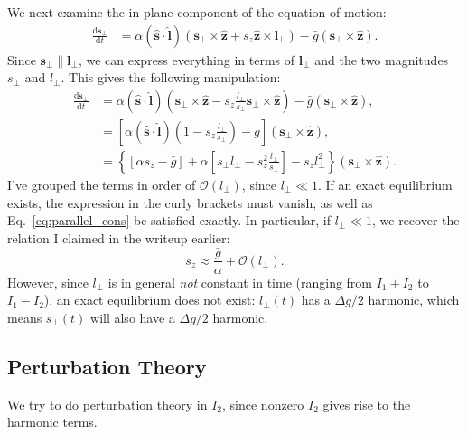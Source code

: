 \documentclass[11pt,
        usenames, %
        dvipsnames %
    ]{article}
\newcommand*{\rd}[2]{\frac{\mathrm{d}#1}{\mathrm{d}#2}}
\newcommand*{\bm}[1]{\boldsymbol{\mathbf{#1}}}
\newcommand*{\uv}[1]{\hat{\bm{#1}}}
\newcommand*{\p}[1]{\left(#1\right)}
\newcommand*{\s}[1]{\left[#1\right]}
\newcommand*{\z}[1]{\left\{#1\right\}}
\begin{document}
We next examine the in-plane component of the equation of motion:
\begin{align}
    \rd{\bm{s}_\perp}{t}
        &= \alpha\p{\uv{s} \cdot \uv{l}}
                \p{\bm{s}_\perp \times \uv{z} + s_z\uv{z} \times \bm{l}_\perp}
            - \bar{g}\p{\bm{s}_\perp \times \uv{z}}.
\end{align}
Since $\bm{s}_\perp \parallel \bm{l}_\perp$, we can express everything in terms
of $\bm{l}_\perp$ and the two magnitudes $s_\perp$ and $l_\perp$. This gives the
following manipulation:
\begin{align}
    \rd{\bm{s}_\perp}{t}
        &= \alpha\p{\uv{s} \cdot \uv{l}}
                \p{\bm{s}_\perp \times \uv{z} - s_z\frac{l_\perp}{s_\perp}
                    \bm{s}_\perp \times \uv{z}}
            - \bar{g}\p{\bm{s}_\perp \times \uv{z}},\\
        &= \s{\alpha\p{\uv{s} \cdot \uv{l}}
            \p{1 - s_z\frac{l_\perp}{s_\perp}} - \bar{g}}
            \p{\bm{s}_\perp \times \uv{z}},\\
        &= \z{\s{\alpha s_z - \bar{g}}
            + \alpha \s{s_\perp l_\perp - s_z^2\frac{l_\perp}{s_\perp}}
            - s_z l_\perp^2}
            \p{\bm{s}_\perp \times \uv{z}}\label{eq:perp_const}.
\end{align}
I've grouped the terms in order of $\mathcal{O}\p{l_\perp}$, since $l_\perp \ll
1$. If an exact equilibrium exists, the expression in the curly brackets must
vanish, as well as Eq.~\eqref{eq:parallel_cons} be satisfied exactly. In
particular, if $l_\perp \ll 1$, we recover the relation I claimed in the writeup
earlier:
\begin{equation}
    s_z \approx \frac{\bar{g}}{\alpha} + \mathcal{O}\p{l_\perp}.
\end{equation}
However, since $l_\perp$ is in general \emph{not} constant in time (ranging from
$I_1 + I_2$ to $I_1 - I_2$), an exact equilibrium does not exist: $l_\perp(t)$
has a $\Delta g / 2$ harmonic, which means $s_\perp(t)$ will also have a
$\Delta g / 2$ harmonic.

\subsection{Perturbation Theory}

We try to do perturbation theory in $I_2$, since nonzero $I_2$ gives rise to the
harmonic terms.
\end{document}
